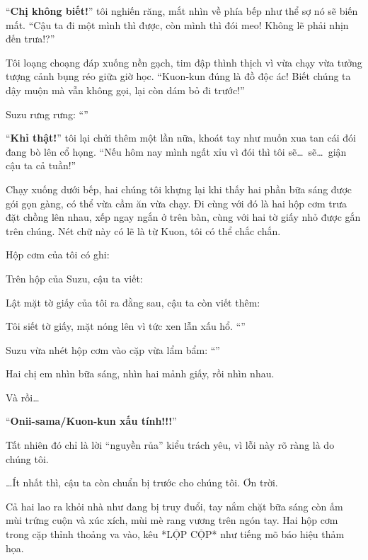 \documentclass[../main.tex]{subfiles}
\begin{document}
``\textbf{Chị không biết!}'' tôi nghiến răng, mắt nhìn về phía bếp như thể sợ nó sẽ biến mất. ``Cậu ta đi một mình thì được, còn mình thì đói meo! Không lẽ phải nhịn đến trưa!?''

Tôi loạng choạng đáp xuống nền gạch, tim đập thình thịch vì vừa chạy vừa tưởng tượng cảnh bụng réo giữa giờ học. ``Kuon-kun đúng là đồ độc ác! Biết chúng ta dậy muộn mà vẫn không gọi, lại còn dám bỏ đi trước!''

Suzu rưng rưng: ``''

``\textbf{Khỉ thật!}'' tôi lại chửi thêm một lần nữa, khoát tay như muốn xua tan cái đói đang bò lên cổ họng. ``Nếu hôm nay mình ngất xỉu vì đói thì tôi sẽ\dots\ sẽ\dots\ giận cậu ta cả tuần!''

Chạy xuống dưới bếp, hai chúng tôi khựng lại khi thấy hai phần bữa sáng được gói gọn gàng, có thể vừa cầm ăn vừa chạy. Đi cùng với đó là hai hộp cơm trưa đặt chồng lên nhau, xếp ngay ngắn ở trên bàn, cùng với hai tờ giấy nhỏ được gắn trên chúng. Nét chữ này có lẽ là từ Kuon, tôi có thể chắc chắn.

Hộp cơm của tôi có ghi:


Trên hộp của Suzu, cậu ta viết:


Lật mặt tờ giấy của tôi ra đằng sau, cậu ta còn viết thêm:


Tôi siết tờ giấy, mặt nóng lên vì tức xen lẫn xấu hổ. ``''

Suzu vừa nhét hộp cơm vào cặp vừa lẩm bẩm: ``''

Hai chị em nhìn bữa sáng, nhìn hai mảnh giấy, rồi nhìn nhau.

Và rồi\dots

``\textbf{Onii-sama/Kuon-kun xấu tính!!!}''

Tất nhiên đó chỉ là lời ``nguyền rủa'' kiểu trách yêu, vì lỗi này rõ ràng là do chúng tôi.

\dots Ít nhất thì, cậu ta còn chuẩn bị trước cho chúng tôi. Ơn trời.

\ct

Cả hai lao ra khỏi nhà như đang bị truy đuổi, tay nắm chặt bữa sáng còn ấm mùi trứng cuộn và xúc xích, mùi mè rang vương trên ngón tay. Hai hộp cơm trong cặp thỉnh thoảng va vào, kêu *LỘP CỘP* như tiếng mõ báo hiệu thảm họa.
\end{document}
